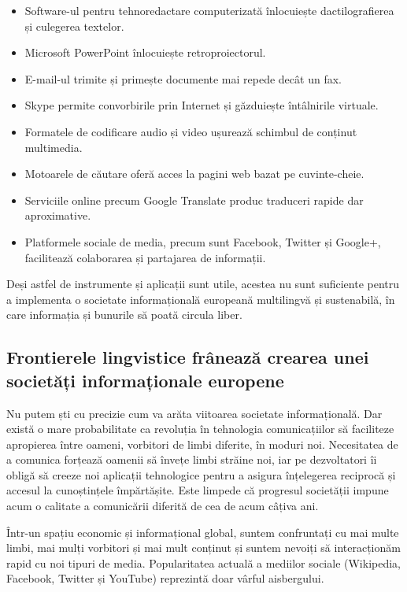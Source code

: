 \begin{multicols}{2}
\begin{itemize}
\item Software-ul pentru tehnoredactare computerizată înlocuiește dactilografierea și culegerea textelor.
\item Microsoft PowerPoint înlocuiește retroproiectorul.
\item E-mail-ul trimite și primește documente mai repede decât un fax.
\item Skype permite convorbirile prin Internet și găzduiește întâlnirile virtuale.
\item Formatele de codificare audio și video ușurează schimbul de conținut multimedia.
\item Motoarele de căutare oferă acces la pagini web bazat pe cuvinte-cheie.
\item Serviciile online precum Google Translate produc traduceri rapide dar aproximative.
\item Platformele sociale de media, precum sunt Facebook, Twitter și Google+, facilitează colaborarea și partajarea de informații.
\end{itemize}

Deși astfel de instrumente și aplicații sunt utile, acestea nu sunt suficiente pentru a implementa o societate informațională europeană multilingvă și sustenabilă, în care informația și bunurile să poată circula liber.

\subsection{Frontierele lingvistice frânează crearea unei societăți informaționale europene}

Nu putem ști cu precizie cum va arăta viitoarea societate informațională. Dar există o mare probabilitate ca revoluția în tehnologia comunicațiilor să faciliteze apropierea între oameni, vorbitori de limbi diferite, în moduri noi. Necesitatea de a comunica forțează oamenii să învețe limbi străine noi, iar pe dezvoltatori îi obligă să creeze noi aplicații tehnologice pentru a asigura înțelegerea reciprocă și accesul la cunoștințele împărtășite. Este limpede că progresul societății impune acum o calitate a comunicării diferită de cea de acum câțiva ani. 


Într-un spațiu economic și informațional global, suntem confruntați cu mai multe limbi, mai mulți vorbitori și mai mult conținut și suntem nevoiți să interacționăm rapid cu noi tipuri de media. Popularitatea actuală a mediilor sociale (Wikipedia, Facebook, Twitter și YouTube) reprezintă doar vârful aisbergului.


\end{multicols}
